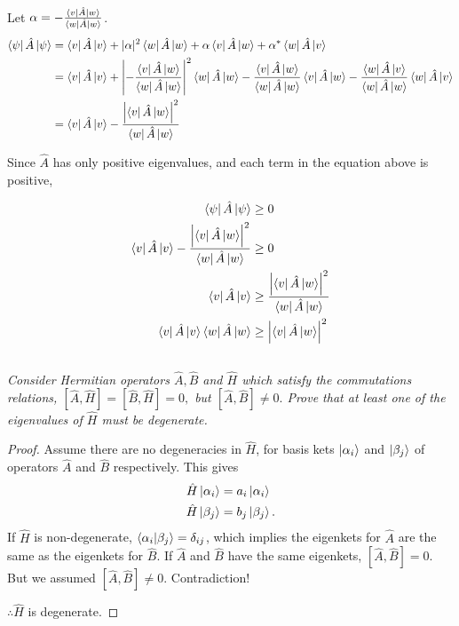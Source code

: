 \documentclass[12pt, letterpaper]{article}
\begin{document}
Let $\alpha = -\frac{\bra{v}\hat A \ket w}{\bra w \hat A \ket w}$.
\begin{align*}
    \bra\psi \hat A \ket\psi& =\bra v\hat{A} \ket v+|\alpha|^{2} \bra w \hat{A}  \ket w + \alpha \bra  v\hat A \ket w+\alpha^{*}\bra w\hat{A} \ket v\\
    & =\bra v\hat{A} \ket v+\left| -\frac{\bra{v}\hat A \ket w}{\bra w \hat A \ket w}\right|^{2} \bra w \hat{A}  \ket w  -\frac{\bra{v}\hat A \ket w}{\bra w \hat A \ket w} \bra  v\hat A \ket w -\frac{\bra{w}\hat A \ket v}{\bra w \hat A \ket w}\bra w\hat{A} \ket v \\
    &= \bra v\hat{A} \ket v - \frac{\left|\bra v \hat A \ket w \right|^2}{\bra w \hat A \ket w}
\end{align*}

Since $\hat A$ has only positive eigenvalues, and each term in the equation above is positive, 

\begin{align*}
     \bra\psi \hat A \ket\psi &\geq 0\\
     \bra v\hat{A} \ket v - \frac{\left|\bra v \hat A \ket w \right|^2}{\bra w \hat A \ket w} &\geq 0\\
     \bra v\hat{A} \ket v &\geq \frac{\left|\bra v \hat A \ket w \right|^2}{\bra w \hat A \ket w}\\
     \bra v\hat{A} \ket v \bra w \hat A \ket w &\geq \left|\bra v \hat A \ket w \right|^2\\
\end{align*}

    
\subsection{}
\textit{Consider Hermitian operators $\hat{A}, \hat{B}$ and $\hat{H}$ which satisfy the commutations relations, $[\hat{A}, \hat{H}]=[\hat{B}, \hat{H}]=0,$ but $[\hat{A}, \hat{B}] \neq 0 .$ Prove that at least one of the eigenvalues of $\hat{H}$ must be degenerate.}
\begin{proof}
Assume there are no degeneracies in $\hat H$, for basis kets $\ket{\alpha_i}$ and $\ket{\beta_j}$ of operators $\hat A$ and $\hat B$ respectively. This gives
\begin{align*}
    \hat H \ket{\alpha_i} &= a_i \ket{\alpha_i}\\
    \hat H \ket{\beta_j} &= b_j \ket{\beta_j}   . 
\end{align*}
If $\hat H$ is non-degenerate, $\bra{\alpha_i}\ket{\beta_j} = \delta_{ij}$, which implies the eigenkets for $\hat A$ are the same as the eigenkets for $\hat B$. If $\hat A$ and $\hat B$ have the same eigenkets, $[\hat A,\hat B] = 0$. But we assumed $[\hat A,\hat B] \neq 0$. Contradiction!

$\therefore \hat H $ is degenerate.
\end{proof} 
\end{document}

